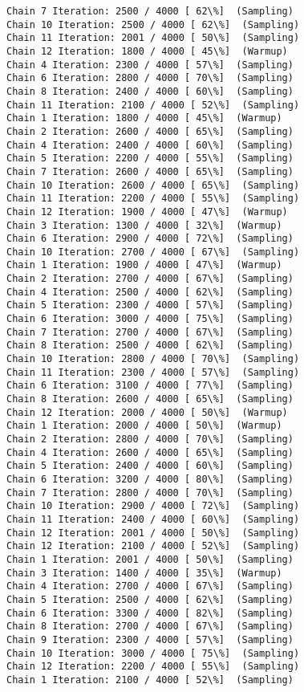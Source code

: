 \documentclass[11pt]{article}
\begin{document}
\begin{Verbatim}[commandchars=\\\{\}]
Chain 7 Iteration: 2500 / 4000 [ 62\%]  (Sampling)
Chain 10 Iteration: 2500 / 4000 [ 62\%]  (Sampling)
Chain 11 Iteration: 2001 / 4000 [ 50\%]  (Sampling)
Chain 12 Iteration: 1800 / 4000 [ 45\%]  (Warmup)
Chain 4 Iteration: 2300 / 4000 [ 57\%]  (Sampling)
Chain 6 Iteration: 2800 / 4000 [ 70\%]  (Sampling)
Chain 8 Iteration: 2400 / 4000 [ 60\%]  (Sampling)
Chain 11 Iteration: 2100 / 4000 [ 52\%]  (Sampling)
Chain 1 Iteration: 1800 / 4000 [ 45\%]  (Warmup)
Chain 2 Iteration: 2600 / 4000 [ 65\%]  (Sampling)
Chain 4 Iteration: 2400 / 4000 [ 60\%]  (Sampling)
Chain 5 Iteration: 2200 / 4000 [ 55\%]  (Sampling)
Chain 7 Iteration: 2600 / 4000 [ 65\%]  (Sampling)
Chain 10 Iteration: 2600 / 4000 [ 65\%]  (Sampling)
Chain 11 Iteration: 2200 / 4000 [ 55\%]  (Sampling)
Chain 12 Iteration: 1900 / 4000 [ 47\%]  (Warmup)
Chain 3 Iteration: 1300 / 4000 [ 32\%]  (Warmup)
Chain 6 Iteration: 2900 / 4000 [ 72\%]  (Sampling)
Chain 10 Iteration: 2700 / 4000 [ 67\%]  (Sampling)
Chain 1 Iteration: 1900 / 4000 [ 47\%]  (Warmup)
Chain 2 Iteration: 2700 / 4000 [ 67\%]  (Sampling)
Chain 4 Iteration: 2500 / 4000 [ 62\%]  (Sampling)
Chain 5 Iteration: 2300 / 4000 [ 57\%]  (Sampling)
Chain 6 Iteration: 3000 / 4000 [ 75\%]  (Sampling)
Chain 7 Iteration: 2700 / 4000 [ 67\%]  (Sampling)
Chain 8 Iteration: 2500 / 4000 [ 62\%]  (Sampling)
Chain 10 Iteration: 2800 / 4000 [ 70\%]  (Sampling)
Chain 11 Iteration: 2300 / 4000 [ 57\%]  (Sampling)
Chain 6 Iteration: 3100 / 4000 [ 77\%]  (Sampling)
Chain 8 Iteration: 2600 / 4000 [ 65\%]  (Sampling)
Chain 12 Iteration: 2000 / 4000 [ 50\%]  (Warmup)
Chain 1 Iteration: 2000 / 4000 [ 50\%]  (Warmup)
Chain 2 Iteration: 2800 / 4000 [ 70\%]  (Sampling)
Chain 4 Iteration: 2600 / 4000 [ 65\%]  (Sampling)
Chain 5 Iteration: 2400 / 4000 [ 60\%]  (Sampling)
Chain 6 Iteration: 3200 / 4000 [ 80\%]  (Sampling)
Chain 7 Iteration: 2800 / 4000 [ 70\%]  (Sampling)
Chain 10 Iteration: 2900 / 4000 [ 72\%]  (Sampling)
Chain 11 Iteration: 2400 / 4000 [ 60\%]  (Sampling)
Chain 12 Iteration: 2001 / 4000 [ 50\%]  (Sampling)
Chain 12 Iteration: 2100 / 4000 [ 52\%]  (Sampling)
Chain 1 Iteration: 2001 / 4000 [ 50\%]  (Sampling)
Chain 3 Iteration: 1400 / 4000 [ 35\%]  (Warmup)
Chain 4 Iteration: 2700 / 4000 [ 67\%]  (Sampling)
Chain 5 Iteration: 2500 / 4000 [ 62\%]  (Sampling)
Chain 6 Iteration: 3300 / 4000 [ 82\%]  (Sampling)
Chain 8 Iteration: 2700 / 4000 [ 67\%]  (Sampling)
Chain 9 Iteration: 2300 / 4000 [ 57\%]  (Sampling)
Chain 10 Iteration: 3000 / 4000 [ 75\%]  (Sampling)
Chain 12 Iteration: 2200 / 4000 [ 55\%]  (Sampling)
Chain 1 Iteration: 2100 / 4000 [ 52\%]  (Sampling)

\end{Verbatim}
\end{document}
